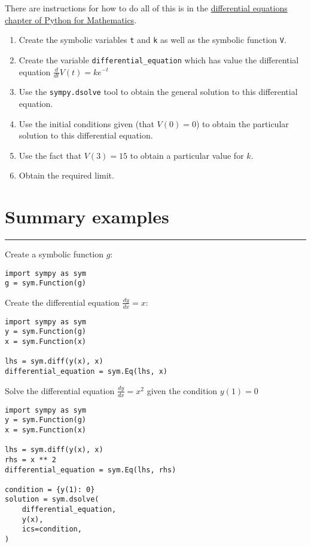 \documentclass{article}
\begin{document}
There are instructions for how to do all of this is in the
\href{https://vknight.org/pfm/tools-for-mathematics/09-differential-equations/how/main.html}{differential equations chapter of Python for Mathematics}.


\begin{enumerate}
    \item Create the symbolic variables \texttt{t} and
        \texttt{k} as well as the symbolic function
        \texttt{V}.
    \item Create the variable \texttt{differential_equation} which
    has value the differential equation $\frac{d}{dt}V(t)=ke^{-t}$    
    \item Use the \texttt{sympy.dsolve} tool to obtain the general
        solution to this differential equation.
    \item Use the initial conditions given (that $V(0)=0$) to obtain the
        particular solution to this differential equation.
    \item Use the fact that $V(3)=15$ to obtain a particular value for $k$.
    \item Obtain the required limit.
\end{enumerate}

\section{Summary examples}
\hrule

\begin{multicols}{2}

    Create a symbolic function $g$:

        \begin{verbatim}
import sympy as sym
g = sym.Function(g)
\end{verbatim}

    Create the differential equation $\frac{dy}{dx}=x$:

        \begin{verbatim}
import sympy as sym
y = sym.Function(g)
x = sym.Function(x)

lhs = sym.diff(y(x), x)
differential_equation = sym.Eq(lhs, x)
\end{verbatim}

    \vspace{2cm}

    Solve the differential equation $\frac{dy}{dx}=x ^ 2$ given the condition
    $y(1)=0$

        \begin{verbatim}
import sympy as sym
y = sym.Function(g)
x = sym.Function(x)

lhs = sym.diff(y(x), x)
rhs = x ** 2
differential_equation = sym.Eq(lhs, rhs)

condition = {y(1): 0}
solution = sym.dsolve(
    differential_equation,
    y(x),
    ics=condition,
)
\end{verbatim}

\end{multicols}
\end{document}
